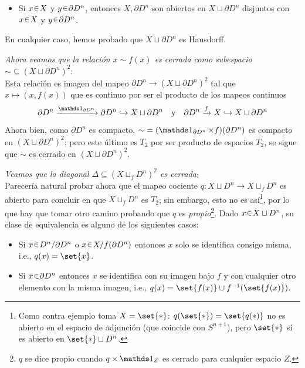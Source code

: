 \begin{sol}[Demostración]
\begin{itemize}
\item Si $x \en X$ y $y \en \partial D^n$, entonces $X,\partial D^n$ son abiertos en $X \sqcup \partial D^n$ disjuntos con $x \en X$ y $y \en \partial D^n$.
\end{itemize}
En cualquier caso, hemos probado que $X \sqcup \partial D^n$ es Hausdorff.\par\vspace{1em}
\emph{Ahora veamos que la relación $x \sim f(x)$ es cerrada como subespacio ${\sim} \subseteq (X \sqcup \partial D^n)^2$}:\\
Esta relación es imagen del mapeo $\partial D^n \to (X \sqcup \partial D^n)^2$ tal que $x \mapsto (x,f(x))$ que es continuo por ser el producto de los mapeos continuos
\[
\partial D^n \xrightarrow{\id_{\partial D^n}} \partial D^n \hookrightarrow X \sqcup \partial D^n
\quad\text{y}\quad
\partial D^n \xrightarrow{f} X \hookrightarrow X \sqcup \partial D^n
\]
Ahora bien, como $\partial D^n$ es compacto, ${\sim} = (\id_{\partial D^n} \times f)(\partial D^n)$ es compacto en $(X \sqcup \partial D^n)^2$; pero este último es $T_2$ por ser producto de espacios $T_2$, se sigue que $\sim$ es cerrado en $(X \sqcup \partial D^n)^2$.\par\vspace{1em}
\emph{Veamos que la diagonal $\Delta \subseteq (X \sqcup_f D^n)^2$ es cerrada}:\\
Parecería natural probar ahora que el mapeo cociente $q \colon X \sqcup D^n \to X \sqcup_f D^n$ es abierto para concluir en que $X \sqcup_f D^n$ es $T_2$; sin embargo, esto no es así\footnote{Como contra ejemplo toma $X = \set{*}$: $q(\set{*}) = \set{q(*)}$ no es abierto en el espacio de adjunción (que coincide con $S^{n+1}$), pero $\set{*}$ sí es abierto en $\set{*} \sqcup D^n$.}, por lo que hay que tomar otro camino probando que $q$ es \emph{propio}\footnote{$q$ se dice propio cuando $q \times {\id_Z}$ es cerrado para cualquier espacio $Z$.}. Dado $x \en X \sqcup D^n$, su clase de equivalencia es alguno de los siguientes casos:
\begin{itemize}
    \item Si $x \en D^n/\partial D^n$ o $x \en X/f(\partial D^n)$ entonces $x$ solo se identifica consigo misma, i.e., $q(x) = \set{x}$.

    \item Si $x \en \partial D^n$ entonces $x$ se identifica con su imagen bajo $f$ y con cualquier otro elemento con la misma imagen, i.e., $q(x) = \set{f(x)} \cup f^{-1}(\set{f(x)})$.


\end{itemize}
\end{sol}
